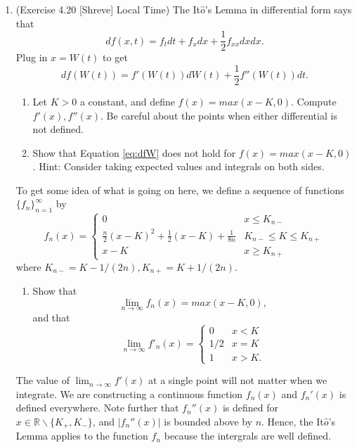 \documentclass{article}
\begin{document}
\begin{enumerate}
\begin{enumerate}
\end{enumerate}
\item (Exercise 4.20 [Shreve] Local Time)
The It$\hat o$'s Lemma in differential form says that \[df(x,t)=f_tdt+f_xdx+\frac12f_{xx}dxdx.\] Plug in $x=W(t)$ to get 
\begin{equation} 
df(W(t)) = f'(W(t))dW(t)+\frac12f''(W(t))dt.
\label{eq:dfW}
\end{equation}
\begin{enumerate}
\item Let $K>0$ a constant, and define $f(x)=max(x-K,0)$. Compute $f'(x), f''(x)$. Be careful about the points when either differential is not defined.
\item Show that Equation \ref{eq:dfW} does not hold for $f(x)=max(x-K,0)$. Hint: Consider taking expected values and integrals on both sides.
\end{enumerate}
To get some idea of what is going on here, we define a sequence of functions $\{f_n\}_{n=1}^{\infty}$ by
\[
f_n(x) = \begin{cases}
0 & x\leq K_{n-} \\
\frac n2(x-K)^2 + \frac12(x-K) +\frac1{8n} & K_{n-}\leq K\leq K_{n+}\\
x-K & x\geq K_{n+}
\end{cases}
\]
where $K_{n-}=K-1/({2n}), K_{n+}=K+1/({2n})$.
\begin{enumerate}
\addtocounter{enumii}{2}
\item Show that
\[
\lim_{n\to\infty} f_n(x) = max(x-K,0),
\]
and that 
\[
\lim_{n\to\infty} f'_n(x) = \begin{cases} 0 & x< K \\
1/2 & x=K \\
1 & x> K. \end{cases}
\]
\end{enumerate}
The value of $\lim_{n\to\infty}f'(x)$ at a single point will not matter when we integrate. We are constructing a continuous function $f_n(x)$ and $f_n'(x)$ is defined everywhere. Note further that $f_n''(x)$ is defined for $x\in\mathbb R\backslash\{K_+,K_-\}$, and $|f_n''(x)|$ is bounded above by $n$. Hence, the It$\hat o$'s Lemma applies to the function $f_n$ because the intergrals are well defined. 
\end{enumerate}
\end{document}
